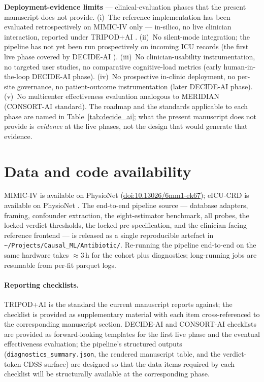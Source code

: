 \documentclass[11pt,a4paper]{article}
\begin{document}
\textbf{Deployment-evidence limits} --- clinical-evaluation phases that the present manuscript does not provide. (i)~The reference implementation has been evaluated retrospectively on MIMIC-IV only --- in-silico, no live clinician interaction, reported under TRIPOD+AI \cite{tripodai2024}. (ii)~No silent-mode integration; the pipeline has not yet been run prospectively on incoming ICU records (the first live phase covered by DECIDE-AI \cite{decideai2022}). (iii)~No clinician-usability instrumentation, no targeted user studies, no comparative cognitive-load metrics (early human-in-the-loop DECIDE-AI phase). (iv)~No prospective in-clinic deployment, no per-site governance, no patient-outcome instrumentation (later DECIDE-AI phase). (v)~No multicenter effectiveness evaluation analogous to MERIDIAN \cite{meridian2025} (CONSORT-AI \cite{consortai2020} standard). The roadmap and the standards applicable to each phase are named in Table~\ref{tab:decide_ai}; what the present manuscript does not provide is \emph{evidence} at the live phases, not the design that would generate that evidence.

\section*{Data and code availability}
MIMIC-IV is available on PhysioNet (\href{https://doi.org/10.13026/6mm1-ek67}{doi:10.13026/6mm1-ek67}); eICU-CRD is available on PhysioNet \cite{pollard2018eicu}. The end-to-end pipeline source --- database adapters, framing, confounder extraction, the eight-estimator benchmark, all probes, the locked verdict thresholds, the locked pre-specification, and the clinician-facing reference frontend --- is released as a single reproducible artefact in \texttt{\textasciitilde/Projects/Causal\_ML/Antibiotic/}. Re-running the pipeline end-to-end on the same hardware takes $\approx 3$\,h for the cohort plus diagnostics; long-running jobs are resumable from per-fit parquet logs.

\paragraph{Reporting checklists.} TRIPOD+AI \cite{tripodai2024} is the standard the current manuscript reports against; the checklist is provided as supplementary material with each item cross-referenced to the corresponding manuscript section. DECIDE-AI \cite{decideai2022} and CONSORT-AI \cite{consortai2020} checklists are provided as forward-looking templates for the first live phase and the eventual effectiveness evaluation; the pipeline's structured outputs (\texttt{diagnostics\_summary.json}, the rendered manuscript table, and the verdict-token CDSS surface) are designed so that the data items required by each checklist will be structurally available at the corresponding phase.
\end{document}
